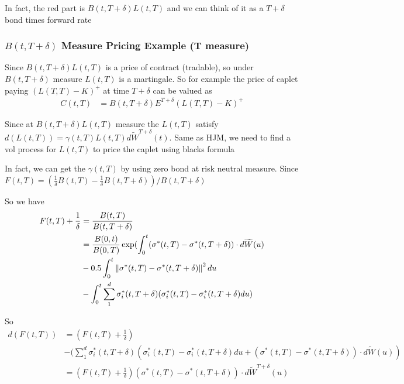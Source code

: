 In fact, the red part is  $B(t, T+\delta) L(t, T)$ and we can think of it as a $T + \delta$ bond times forward rate

\subsubsection{$B(t, T+\delta)$ Measure Pricing Example (T measure)}
Since  $B(t, T+\delta) L(t, T)$ is a price of contract (tradable), so under $B(t, T+\delta)$ measure $L(t, T)$ is a martingale. So for example the price of caplet paying $(L(T, T) - K)^+$ at time $T + \delta$ can be valued as
\begin{equation}
\begin{aligned}
C(t, T) &=  B(t, T+\delta) E^{T+\delta} (L(T, T) - K)^+
\end{aligned}
\end{equation}

Since at  $B(t, T+\delta) L(t, T)$  measure the $L(t, T)$ satisfy $d(L(t, T)) = \gamma(t, T) L(t, T) d\widetilde{W}^{T+\delta}(t)$. {\color{blue}Same as HJM, we need to find a vol process for $L(t, T)$ to price the caplet using blacks formula}

In fact, we can get the $\gamma(t, T)$ by using zero bond at risk neutral measure. Since $F(t, T) = (\frac{1}{\delta}B(t, T) - \frac{1}{\delta}B(t, T+\delta)) / B(t, T+\delta)$

So  we have
\begin{equation}
\begin{aligned}
 F(t, T) + \frac{1}{\delta} &= \frac{B(t, T)}{B(t, T+\delta)}\\
&= \frac{B(0, t)}{B(0, T)} \exp(\int_{0}^{t} (\sigma^\ast(t, T) - \sigma^\ast(t, T+\delta)) \cdot d\widetilde{W}(u) \\ &-0.5\int_{0} ^ {t} \left\lVert\sigma^\ast(t, T) - \sigma^\ast(t, T+\delta)\right\rVert ^ 2 du \\
&- \int_0^t\sum_{1} ^ {d} \sigma^\ast_{i}(t, T+\delta)(\sigma^\ast_{i}(t, T) - \sigma^\ast_{i}(t, T+\delta) du)
\end{aligned}
\end{equation}

So
\begin{equation}
\begin{aligned}
 d(F(t, T)) &= (F(t, T) + \frac{1}{\delta}) \\
 &-  (\sum_{1} ^ {d}  \sigma^\ast_{i}(t, T+\delta)(\sigma^\ast_{i}(t, T) - \sigma^\ast_{i}(t, T+\delta) du +  (\sigma^\ast(t, T) - \sigma^\ast(t, T+\delta)) \cdot d\widetilde{W}(u)) \\
 &= (F(t, T) + \frac{1}{\delta}) (\sigma^\ast(t, T) - \sigma^\ast(t, T+\delta)) \cdot d\widetilde{W}^{T + \delta}(u)
\end{aligned}
\end{equation}

